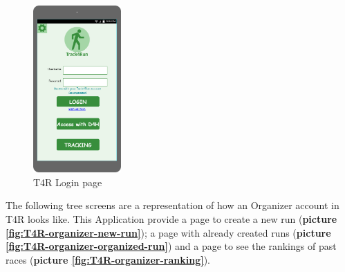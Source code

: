 \begin{figure}[H]
  \centering
  \includegraphics[width=0.30\textwidth]{pictures/mockup/T4R-login.png}
  \caption{T4R Login page}
  \label{fig:T4R-login}
\end{figure}

The following tree screens are a representation of how an Organizer account in T4R looks like. This Application provide a page to create a new run (\textbf{picture \ref{fig:T4R-organizer-new-run}}); a page with already created runs (\textbf{picture \ref{fig:T4R-organizer-organized-run}}) and a page to see the rankings of past races (\textbf{picture \ref{fig:T4R-organizer-ranking}}).

